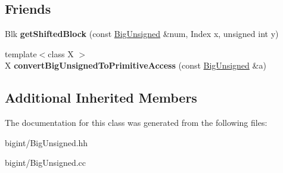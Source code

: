 \subsection*{Friends}
\begin{DoxyCompactItemize}
\item 
\mbox{\label{class_big_unsigned_a071e047bb0c201c2efe2867378a03a2c}} 
Blk {\bfseries get\+Shifted\+Block} (const \mbox{\hyperlink{class_big_unsigned}{Big\+Unsigned}} \&num, Index x, unsigned int y)
\item 
\mbox{\label{class_big_unsigned_a96741d68d18c9847cc65eeb8761d7497}} 
{\footnotesize template$<$class X $>$ }\\X {\bfseries convert\+Big\+Unsigned\+To\+Primitive\+Access} (const \mbox{\hyperlink{class_big_unsigned}{Big\+Unsigned}} \&a)
\end{DoxyCompactItemize}
\subsection*{Additional Inherited Members}


The documentation for this class was generated from the following files\+:\begin{DoxyCompactItemize}
\item 
bigint/Big\+Unsigned.\+hh\item 
bigint/Big\+Unsigned.\+cc\end{DoxyCompactItemize}

